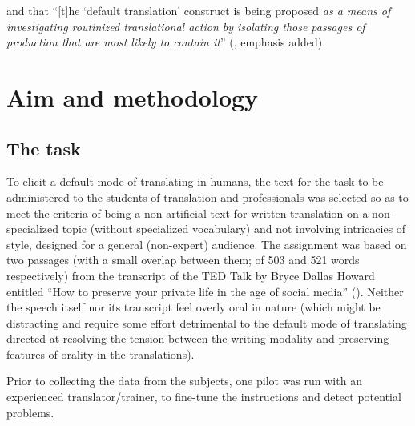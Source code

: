 \documentclass[output=paper]{langscibook}
\begin{document}
\noindent and that “[t]he ‘default translation’ construct is being proposed \textit{as a means of investigating routinized translational action by isolating those passages of production that are most likely to contain it}” (\citealt[198]{Halverson2019}, emphasis added).

\section{Aim and methodology}\label{sec:kamenicka:3}

\subsection{The task}\label{sec:kamenicka:3.1}

To elicit a default mode of translating in humans, the text for the task to be administered to the students of translation and professionals was selected so as to meet the criteria of being a non-artificial text for written translation on a non-specialized topic (without specialized vocabulary) and not involving intricacies of style, designed for a general (non-expert) audience. The assignment was based on two passages (with a small overlap between them; of 503 and 521 words respectively) from the transcript of the TED Talk by Bryce Dallas Howard entitled “How to preserve your private life in the age of social media” (\citealt{Dallas2022}). Neither the speech itself nor its transcript feel overly oral in nature (which might be distracting and require some effort detrimental to the default mode of translating directed at resolving the tension between the writing modality and preserving features of orality in the translations).

Prior to collecting the data from the subjects, one pilot was run with an experienced translator/trainer, to fine-tune the instructions and detect potential problems.
\end{document}
